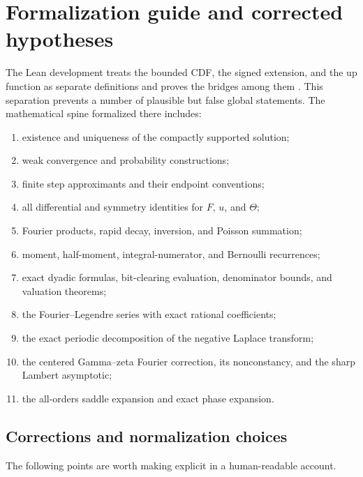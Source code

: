 \documentclass[11pt]{article}
\theoremstyle{definition}
\theoremstyle{remark}
\begin{document}
\section[Formalization guide]{Formalization guide and corrected hypotheses}\label{sec:formalization}
The Lean development treats the bounded CDF, the signed extension, and the up function as separate definitions and proves the bridges among them \cite{ReshetnikovLean,ReshetnikovAudit}.  This separation prevents a number of plausible but false global statements.  The mathematical spine formalized there includes:
\begin{enumerate}[label=\arabic*.]
\item existence and uniqueness of the compactly supported solution;
\item weak convergence and probability constructions;
\item finite step approximants and their endpoint conventions;
\item all differential and symmetry identities for $F$, $u$, and $\Theta$;
\item Fourier products, rapid decay, inversion, and Poisson summation;
\item moment, half-moment, integral-numerator, and Bernoulli recurrences;
\item exact dyadic formulas, bit-clearing evaluation, denominator bounds, and valuation theorems;
\item the Fourier--Legendre series with exact rational coefficients;
\item the exact periodic decomposition of the negative Laplace transform;
\item the centered Gamma--zeta Fourier correction, its nonconstancy, and the sharp Lambert asymptotic;
\item the all-orders saddle expansion and exact phase expansion.
\end{enumerate}

\subsection{Corrections and normalization choices}
The following points are worth making explicit in a human-readable account.
\end{document}

